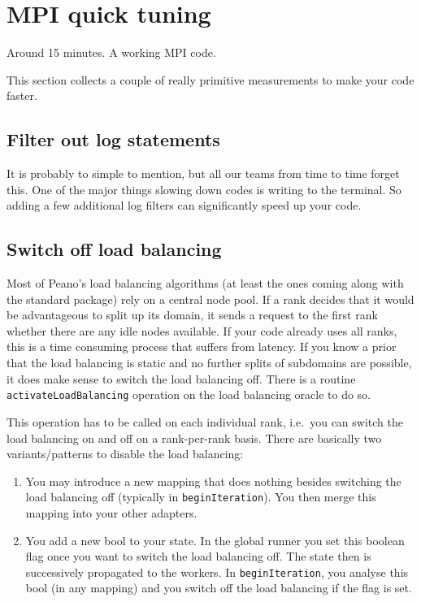 \section{MPI quick tuning}


\chapterDescription
  {
    Around 15 minutes.
  }
  {
    A working MPI code.
  }


This section collects a couple of really primitive measurements to make your
code faster.

\subsection{Filter out log statements}

It is probably to simple to mention, but all our teams from time to time forget
this. 
One of the major things slowing down codes is writing to the terminal. 
So adding a few additional log filters can significantly speed up your code.



\subsection{Switch off load balancing}

Most of Peano's load balancing algorithms (at least the ones coming along with
the standard package) rely on a central node pool.
If a rank decides that it would be advantageous to split up its domain, it sends
a request to the first rank whether there are any idle nodes available.
If your code already uses all ranks, this is a time consuming process that
suffers from latency.
If you know a prior that the load balancing is static and no further splits of
subdomains are possible, it does make sense to switch the load balancing off.
There is a routine \texttt{activateLoadBalancing} operation on the load
balancing oracle to do so.

This operation has to be called on each individual rank, i.e.~you can switch 
the load balancing on and off on a rank-per-rank basis. There are basically two
variants/patterns to disable the load balancing:
\begin{enumerate}
  \item You may introduce a new mapping that does nothing besides switching the
  load balancing off (typically in \texttt{beginIteration}). You then merge this
  mapping into your other adapters.
  \item You add a new bool to your state. In the global runner you set this
  boolean flag once you want to switch the load balancing off. The state then is
  successively propagated to the workers. In \texttt{beginIteration}, you
  analyse this bool (in any mapping) and you switch off the load balancing if
  the flag is set.
\end{enumerate}

